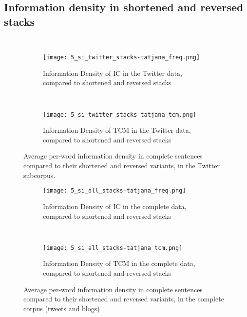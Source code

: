 \documentclass[output=paper,colorlinks,citecolor=brown]{langscibook}
\begin{document}


{\sloppy\printbibliography[heading=subbibliography,notkeyword=this]}
\newpage

\begin{paperappendix}

\section{Information density in shortened and reversed stacks}
~
\begin{figure}[h]
  \centering
\begin{subfigure}[t]{.66\textwidth}
%     
    \texttt{[image: 5\_si\_twitter\_stacks-tatjana\_freq.png]}
    \caption{Information Density of IC in the Twitter data, compared to shortened and reversed stacks}
\end{subfigure}\medskip\\
\begin{subfigure}[t]{.66\textwidth}
%     
    \texttt{[image: 5\_si\_twitter\_stacks-tatjana\_tcm.png]}
    \caption{Information Density of TCM in the Twitter data, compared to shortened and reversed stacks}
\end{subfigure}
\caption{Average per-word information density in complete sentences compared to their shortened and reversed variants, in the Twitter subcorpus.} 
\label{fig:twitter-tcm-short-rev}
\end{figure}


\begin{figure}
  \centering
\begin{subfigure}[t]{.66\textwidth}
%     
    \texttt{[image: 5\_si\_all\_stacks-tatjana\_freq.png]}
    \caption{Information Density of IC in the complete data, compared to shortened and reversed stacks}
\end{subfigure}\medskip\\
\begin{subfigure}[t]{.66\textwidth}
%     
    \texttt{[image: 5\_si\_all\_stacks-tatjana\_tcm.png]}
    \caption{Information Density of TCM in the complete data, compared to shortened and reversed stacks}
\end{subfigure}
\caption{Average per-word information density in complete sentences compared to their shortened and reversed variants, in the complete corpus (tweets and blogs)}
\label{fig:all-tcm-short-rev}
\end{figure}
\end{paperappendix}
\end{document}
